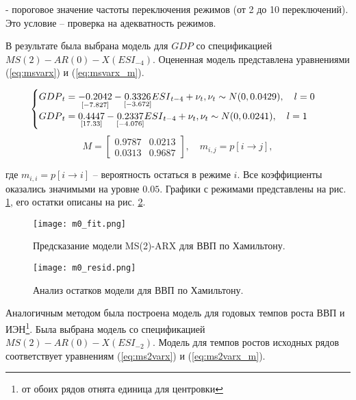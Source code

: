\documentclass[a4paper,14pt]{extreport}
\begin{document}
	- пороговое значение частоты переключения режимов (от 2 до 10 переключений). Это условие -- проверка на адекватность режимов.
	
	В результате была выбрана модель для ${GDP}$ со спецификацией $MS(2)-AR(0)-X({ESI}_{-4})$. Оцененная модель представлена уравнениями (\ref{eq:msvarx}) и (\ref{eq:msvarx_m}).
	
	{
		
		\begin{equation}
		\begin{cases}
		{GDP}_{t} = 
		\underset{[-7.827]}{-0.2042} 
		- \underset{[-3.672]}{0.3326} {ESI}_{t-4}
		+ \nu_{t} , \space \nu_{t} \sim N(0, 0.0429)
		, \quad l=0 \\
		{GDP}_{t} = 
		\underset{[17.33]}{0.4447}
		- \underset{[-4.076]}{0.2337} {ESI}_{t-4}
		+ \nu_{t} , \space \nu_{t} \sim N(0, 0.0241)
		, \quad l=1
		\end{cases}			
		\label{eq:msvarx}
		\end{equation}
		\begin{equation}
		M = 
		\begin{bmatrix}
		0.9787 & 0.0213 \\
		0.0313 & 0.9687
		\end{bmatrix}
		, \quad m_{i,j} = p[i \rightarrow j],
		\label{eq:msvarx_m}
		\end{equation}
		
	}
	
	где $m_{i,i} = p[i \rightarrow i]$ -- вероятность остаться в режиме $i$. Все коэффициенты оказались значимыми на уровне $0.05$. Графики с режимами представлены на рис. \ref{fig:hp-fitcompare}, его остатки описаны на рис. \ref{fig:hp-residcomp}.
	
	{
		\begin{figure}
			\texttt{[image: m0\_fit.png]}
			\caption{Предсказание модели MS(2)-ARX для ВВП по Хамильтону.}
			\label{fig:hp-fitcompare}
		\end{figure}
		\begin{figure}
			\texttt{[image: m0\_resid.png]}
			\caption{Анализ остатков модели для ВВП по Хамильтону.}
			\label{fig:hp-residcomp}
		\end{figure}
	}
	
	
	Аналогичным методом была построена модель для годовых темпов роста ВВП и ИЭН\footnote{от обоих рядов отнята единица для центровки}. Была выбрана модель со спецификацией $MS(2)-AR(0)-X({ESI}_{-2})$. Модель для темпов ростов исходных рядов соответствует уравнениям (\ref{eq:ms2varx}) и (\ref{eq:ms2varx_m}).
	
\end{document}
